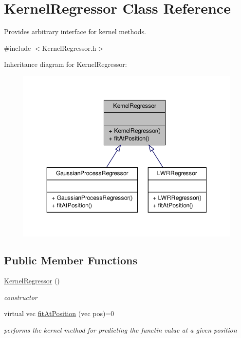 \hypertarget{classKernelRegressor}{\section{\-Kernel\-Regressor \-Class \-Reference}
\label{classKernelRegressor}
}


\-Provides arbitrary interface for kernel methods.  




{\ttfamily \#include $<$\-Kernel\-Regressor.\-h$>$}



\-Inheritance diagram for \-Kernel\-Regressor\-:\nopagebreak
\begin{figure}[H]
\begin{center}
\leavevmode
\includegraphics[width=350pt]{classKernelRegressor__inherit__graph}
\end{center}
\end{figure}
\subsection*{\-Public \-Member \-Functions}
\begin{DoxyCompactItemize}
\item 
\hyperlink{classKernelRegressor_a4dc472698406ed91148f7245d4c41687}{\-Kernel\-Regressor} ()
\begin{DoxyCompactList}\small\item\em constructor \end{DoxyCompactList}\item 
virtual vec \hyperlink{classKernelRegressor_a65529e1d764f9abf0498c93a35ac3f16}{fit\-At\-Position} (vec pos)=0
\begin{DoxyCompactList}\small\item\em performs the kernel method for predicting the functin value at a given position \end{DoxyCompactList}\end{DoxyCompactItemize}


